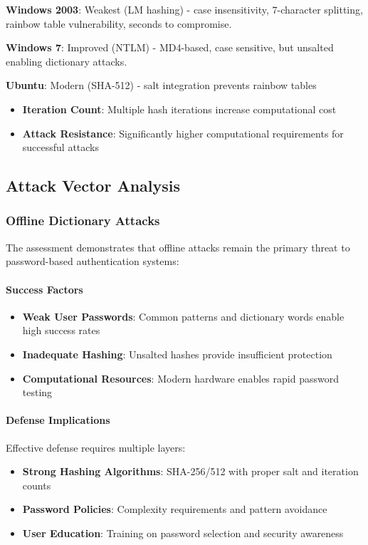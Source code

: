 {\small
\textbf{Windows 2003}: Weakest (LM hashing) - case insensitivity, 7-character splitting, rainbow table vulnerability, seconds to compromise.

\textbf{Windows 7}: Improved (NTLM) - MD4-based, case sensitive, but unsalted enabling dictionary attacks.

\textbf{Ubuntu}: Modern (SHA-512) - salt integration prevents rainbow tables
\begin{itemize}
    \item \textbf{Iteration Count}: Multiple hash iterations increase computational cost
    \item \textbf{Attack Resistance}: Significantly higher computational requirements for successful attacks
\end{itemize}

\subsection{Attack Vector Analysis}

\subsubsection{Offline Dictionary Attacks}

The assessment demonstrates that offline attacks remain the primary threat to password-based authentication systems:

\paragraph{Success Factors}
\begin{itemize}
    \item \textbf{Weak User Passwords}: Common patterns and dictionary words enable high success rates
    \item \textbf{Inadequate Hashing}: Unsalted hashes provide insufficient protection
    \item \textbf{Computational Resources}: Modern hardware enables rapid password testing
\end{itemize}

\paragraph{Defense Implications}
Effective defense requires multiple layers:
\begin{itemize}
    \item \textbf{Strong Hashing Algorithms}: SHA-256/512 with proper salt and iteration counts
    \item \textbf{Password Policies}: Complexity requirements and pattern avoidance
    \item \textbf{User Education}: Training on password selection and security awareness
\end{itemize}

}
